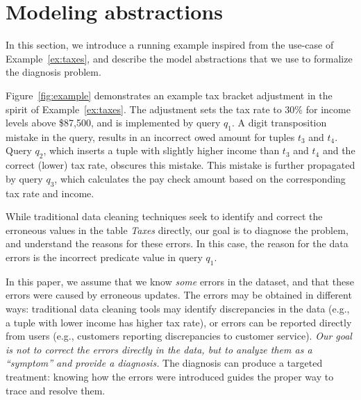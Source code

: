 
\section{Modeling abstractions}
\label{sec:abstractions}

In this section, we introduce a running example inspired from the use-case of
Example~\ref{ex:taxes}, and describe the model abstractions that we use to
formalize the diagnosis problem.





\begin{example}\label{ex:taxes2}
Figure~\ref{fig:example} demonstrates an example tax bracket adjustment in the
spirit of Example~\ref{ex:taxes}. The adjustment sets the tax rate to 30\% for
income levels above \$87,500, and is implemented by query $q_1$. A digit
transposition mistake in the query, results in an incorrect owed amount for tuples
$t_3$ and $t_4$. Query $q_2$, which inserts a tuple with slightly higher
income than $t_3$ and $t_4$ and the correct (lower) tax rate, obscures this mistake.
This mistake is further propagated by query $q_3$, which calculates the pay 
check amount based on the corresponding
tax rate and income. 
\iffalse    
Figure~\ref{fig:example} demonstrates an example tax bracket adjustment in the
spirit of Example~\ref{ex:taxes}. The adjustment sets the tax rate to 30\% for
income levels above \$87,500, and is implemented by query $q_1$. A digit
transposition mistake in the query, results in an incorrect tax rate for tuples
$t_3$ and $t_4$. Query $q_2$ that calculates the amount owed based on the corresponding
tax rate and income propagates the error to other fields. The mistake is
further obscured by query $q_3$, which inserts a tuple with slightly higher
income than $t_3$ and $t_4$ and the correct (lower) tax rate.
\fi
\end{example}
\vspace*{-0.07in}
While traditional data cleaning techniques seek to identify and correct the
erroneous values in the table \emph{Taxes} directly, our goal is to diagnose
the problem, and understand the reasons for these errors. In this case, the
reason for the data errors is the incorrect predicate value in query $q_1$.

In this paper, we assume that we know \emph{some} errors in the dataset, and
that these errors were caused by erroneous updates. The errors may be
obtained in different ways: traditional data cleaning tools may identify
discrepancies in the data (e.g., a tuple with lower income has higher tax
rate), or errors can be reported directly from users (e.g., customers
reporting discrepancies to customer service). \emph{Our goal is not to correct
the errors directly in the data, but to analyze them as a ``symptom'' and provide a
diagnosis.} The diagnosis can produce a targeted treatment: knowing how the
errors were introduced guides the proper way to trace and resolve them.


